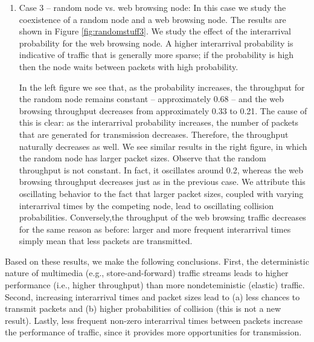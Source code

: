 \documentclass{llncs}
\begin{document}
\begin{enumerate}
	\item Case 3 -- random node vs. web browsing node: In this case we study the coexistence of a random node and a web browsing node. The results are shown in Figure \ref{fig:randomstuff3}. We study the effect of the interarrival probability for the web browsing node. A higher interarrival probability is indicative of traffic that is generally more sparse; if the probability is high then the node waits between packets with high probability. 

	In the left figure we see that, as the probability increases, the throughput for the random node remains constant -- approximately 0.68 -- and the web browsing throughput decreases from approximately 0.33 to 0.21. The cause of this is clear: as the interarrival probability increases, the number of packets that are generated for transmission decreases. Therefore, the throughput naturally decreases as well. We see similar results in the right figure, in which the random node has larger packet sizes. Observe that the random throughput is not constant. In fact, it oscillates around 0.2, whereas the web browsing throughput decreases just as in the previous case. We attribute this oscillating behavior to the fact that larger packet sizes, coupled with varying interarrival times by the competing node, lead to oscillating collision probabilities. Conversely,the throughput of the web browsing traffic decreases for the same reason as before: larger and more frequent interarrival times simply mean that less packets are transmitted.
\end{enumerate}

Based on these results, we make the following conclusions. First, the deterministic nature of multimedia (e.g., store-and-forward) traffic streams leads to higher performance (i.e., higher throughput) than more nondeteministic (elastic) traffic. Second, increasing interarrival times and packet sizes lead to (a) less chances to transmit packets and (b) higher probabilities of collision (this is not a new result). Lastly, less frequent non-zero interarrival times between packets increase the performance of traffic, since it provides more opportunities for transmission.


\end{document}
